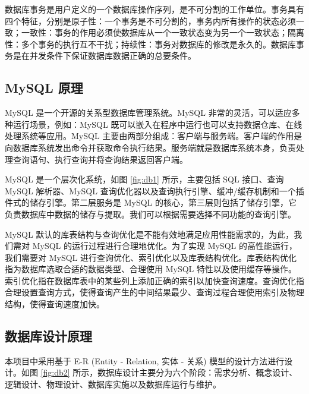 数据库事务是用户定义的一个数据库操作序列，是不可分割的工作单位。事务具有四个特征，分别是原子性：一个事务是不可分割的，事务内所有操作的状态必须一致；一致性：事务的作用必须使数据库从一个一致状态变为另一个一致状态；隔离性：多个事务的执行互不干扰；持续性：事务对数据库的修改是永久的。数据库事务是在并发条件下保证数据库数据正确的总要条件。

\subsection{MySQL 原理}
MySQL 是一个开源的关系型数据库管理系统。MySQL 非常的灵活，可以适应多种运行场景，例如：MySQL 既可以嵌入在程序中运行也可以支持数据仓库、在线处理系统等应用\cite{姜承尧2011mysql}。MySQL 主要由两部分组成：客户端与服务端。客户端的作用是向数据库系统发出命令并获取命令执行结果。服务端就是数据库系统本身，负责处理查询语句、执行查询并将查询结果返回客户端。

MySQL 是一个层次化系统，如图 \ref{fig:db1} 所示，主要包括 SQL 接口、查询 MySQL 解析器、MySQL 查询优化器以及查询执行引擎、缓冲/缓存机制和一个插件式的储存引擎。第二层服务是 MySQL 的核心，第三层则包括了储存引擎，它负责数据库中数据的储存与提取。我们可以根据需要选择不同功能的查询引擎\cite{schwartz2012high}。


MySQL 默认的库表结构与查询优化是不能有效地满足应用性能需求的，为此，我们需对 MySQL 的运行过程进行合理地优化。为了实现 MySQL 的高性能运行，我们需要对 MySQL 进行查询优化、索引优化以及库表结构优化。库表结构优化指为数据库选取合适的数据类型、合理使用 MySQL 特性以及使用缓存等操作。索引优化指在数据库表中的某些列上添加正确的索引以加快查询速度。查询优化指合理设置查询方式，使得查询产生的中间结果最少、查询过程合理使用索引及物理结构，使得查询速度加快。

\subsection{数据库设计原理}

本项目中采用基于 E-R (Entity - Relation, 实体 - 关系) 模型的设计方法进行设计。如图 \ref{fig:db2} 所示，数据库设计主要分为六个阶段：需求分析、概念设计、逻辑设计、物理设计、数据库实施以及数据库运行与维护\cite{王珊2006数据库系统概论}。

